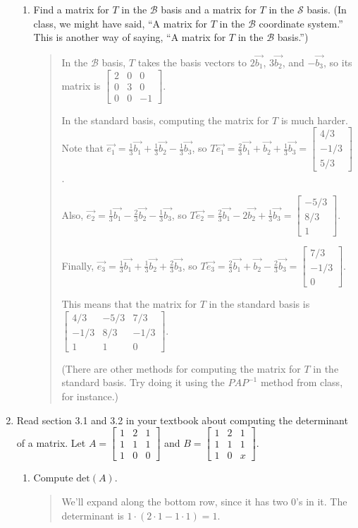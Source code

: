 \documentclass[letter]{article}
\newcommand{\Det}{\mathrm{det}}
\newcommand{\mat}[1]{\begin{bmatrix}#1\end{bmatrix}}
\begin{document}
\begin{enumerate}
\begin{enumerate}
				\item Find a matrix for $T$ in the $\mathcal B$ basis  and a matrix for $T$ in
					the $\mathcal S$ basis. (In class, we might have said, ``A matrix for
					$T$ in the $\mathcal B$ coordinate system.''  This is another way of 
					saying, ``A matrix for $T$ in the $\mathcal B$ basis.'')
				\begin{quote}
					In the $\mathcal{B}$ basis, $T$ takes the basis vectors to $2 \vec{b_1}$, $3 \vec{b_2}$, and $- \vec{b_3}$, so its matrix is $\mat{2 & 0 & 0 \\ 0 & 3 & 0 \\ 0 & 0 & -1}$.
					
					In the standard basis, computing the matrix for $T$ is much harder.  Note that $\vec{e_1} = \frac{1}{3} \vec{b_1} + \frac{1}{3} \vec{b_2} - \frac{1}{3} \vec{b_3}$, so $T \vec{e_1} = \frac{2}{3} \vec{b_1} + \vec{b_2} + \frac{1}{3} \vec{b_3} = \mat{4/3\\-1/3\\5/3}$.
					
					Also, $\vec{e_2} = \frac{1}{3} \vec{b_1} - \frac{2}{3} \vec{b_2} - \frac{1}{3} \vec{b_3}$, so $T \vec{e_2} = \frac{2}{3} \vec{b_1} - 2 \vec{b_2} + \frac{1}{3} \vec{b_3} = \mat{-5/3 \\ 8/3 \\ 1}$.
					
					Finally, $\vec{e_3} = \frac{1}{3} \vec{b_1} + \frac{1}{3} \vec{b_2} + \frac{2}{3} \vec{b_3}$, so $T \vec{e_3} = \frac{2}{3} \vec{b_1} + \vec{b_2} - \frac{2}{3} \vec{b_3} = \mat{7/3 \\ -1/3 \\ 0}$.
					
					This means that the matrix for $T$ in the standard basis is $\mat{4/3 & -5/3 & 7/3 \\ -1/3 & 8/3 & -1/3 \\ 1 & 1 & 0}$.
					
					(There are other methods for computing the matrix for $T$ in the standard basis.  Try doing it using the $PAP^{-1}$ method from class, for instance.)
				\end{quote}

			\end{enumerate}
		
		\item Read section 3.1 and 3.2 in your textbook about computing the determinant of a matrix.
			Let $A=\mat{1&2&1\\1&1&1\\1&0&0}$ and $B=\mat{1&2&1\\1&1&1\\1&0&x}$.
		\begin{enumerate}
			\item Compute $\Det(A)$.
				\begin{quote}
					We'll expand along the bottom row, since it has two 0's in it.  The determinant is $1 \cdot (2 \cdot 1 - 1 \cdot 1) = 1$.
				\end{quote}


\end{enumerate}
\end{enumerate}
\end{document}
